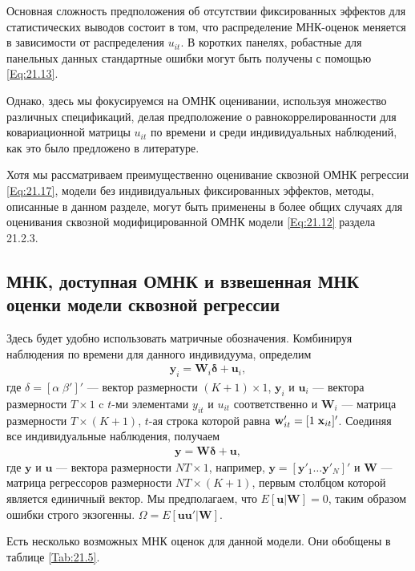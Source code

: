Основная сложность предположения об отсутствии фиксированных эффектов для статистических выводов состоит в том, что распределение МНК-оценок меняется в зависимости от распределения $u_{it}$. В коротких панелях, робастные для панельных данных стандартные ошибки могут быть получены с помощью \ref{Eq:21.13}.

Однако, здесь мы фокусируемся на ОМНК оценивании, используя множество различных спецификаций, делая предположение о равнокоррелированности для  ковариационной матрицы $u_{it}$  по времени и среди индивидуальных наблюдений, как это было предложено в литературе.

Хотя мы рассматриваем преимущественно оценивание сквозной ОМНК регрессии \ref{Eq:21.17}, модели без индивидуальных фиксированных эффектов, методы, описанные в данном разделе, могут быть применены в более общих случаях для оценивания сквозной модифицированной ОМНК модели \ref{Eq:21.12} раздела 21.2.3.

\subsection{МНК, доступная ОМНК и взвешенная МНК оценки модели сквозной регрессии}

Здесь будет удобно использовать матричные обозначения. Комбинируя наблюдения по времени для данного индивидуума, определим
\begin{align}
\mathbf y_{i}=\mathbf W_{i}\bm\delta+\mathbf u_{i},
\label{Eq:21.18}
\end{align}
где $\delta=[\alpha \; \beta']'$ --- вектор размерности  $(K+1)\times 1$, $\mathbf y_i$ и $\mathbf u_i$ --- вектора размерности $T \times 1$ c $t$-ми элементами $y_{it}$ и $u_{it}$ соответственно и $\mathbf W_i$ --- матрица размерности $T \times (K+1)$, $t$-ая строка которой равна $\mathbf w'_{it}=[1 \; \mathbf{x}_{it}]'$. Соединяя все индивидуальные наблюдения, получаем
\begin{align}
\mathbf y=\mathbf W\bm\delta+ \mathbf u,
\label{Eq:21.19}
\end{align}
где $\mathbf y$  и $\mathbf u$ --- вектора размерности $NT \times 1$, например, $\mathbf y=[\mathbf y'_1 \dots \mathbf y'_N]'$ и $\mathbf W$ --- матрица регрессоров размерности $NT \times (K + 1)$, первым столбцом которой является единичный вектор. Мы предполагаем, что $E[\mathbf u| \mathbf W]=0$, таким образом ошибки строго экзогенны. $\Omega=E[\mathbf u \mathbf u'|\mathbf W]$.

Есть несколько возможных МНК оценок для данной модели. Они обобщены в таблице \ref{Tab:21.5}.

